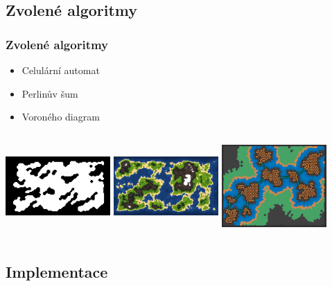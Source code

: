 \documentclass{beamer}
\begin{document}
	\subsection{Zvolené algoritmy}
\begin{frame}
	\frametitle{Zvolené algoritmy}
	\begin{multicols}{3}
  		\begin{itemize}
 			\item Celulární automat 
			\item Perlinův šum
 			\item Voroného diagram
		\end{itemize}
	\end{multicols}
	\begin{multicols}{3}
  		\includegraphics[width=4cm, height=4cm]{celular-ex.png}
  		\includegraphics[width=4cm, height=4cm]{perlin-ex.png}
  		\includegraphics[width=4cm, height=4cm]{voronoi-ex.png}
	\end{multicols}
\end{frame}
	\subsection{Implementace}
	
\end{document}
